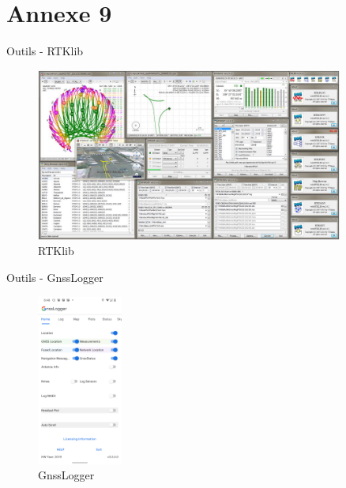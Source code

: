 \documentclass[xcolor=dvipsnames,envcountsect]{beamer}
\begin{document}
\section{Annexe 9}
\begin{frame}{Outils - RTKlib}
	\begin{figure}
		\centering
		\includegraphics[width=0.9\textwidth]{./Figures/rtklib_over.jpg}
		\caption{RTKlib}
	\end{figure}
\end{frame}
\begin{frame}{Outils - GnssLogger}
	\begin{figure}
		\centering
		\includegraphics[width=0.25\textwidth]{./Figures/gnss_logger.png}
		\caption{GnssLogger}
	\end{figure}
\end{frame}
\end{document}
